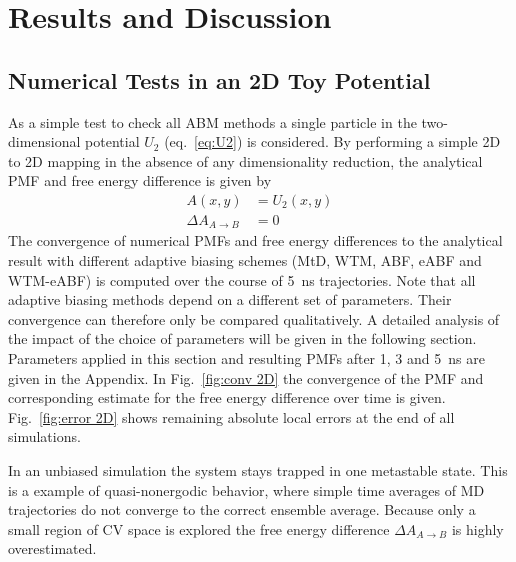 \chapter{Results and Discussion}
\label{cha:results}
\section{Numerical Tests in an 2D Toy Potential}
\label{sec:2D}
As a simple test to check all ABM methods a single particle in the two-dimensional potential $U_2$ (eq.~\ref{eq:U2}) is considered.
By performing a simple 2D to 2D mapping in the absence of any dimensionality reduction, the analytical PMF and free energy difference is given by
\begin{equation}
  \begin{split}
    A(x,y)&=U_2(x,y) \\
    \Delta A_{A\to B} &= 0
  \end{split}
\end{equation}
The convergence of numerical PMFs and free energy differences to the analytical result with different adaptive biasing schemes (MtD, WTM, ABF, eABF and WTM-eABF) is computed over the course of 5~ns trajectories.
Note that all adaptive biasing methods depend on a different set of parameters.
Their convergence can therefore only be compared qualitatively.
A detailed analysis of the impact of the choice of parameters will be given in the following section.
Parameters applied in this section and resulting PMFs after 1, 3 and 5~ns are given in the Appendix.
In Fig.~\ref{fig:conv 2D} the convergence of the PMF and corresponding estimate for the free energy difference over time is given.
Fig.~\ref{fig:error 2D} shows remaining absolute local errors at the end of all simulations.

In an unbiased simulation the system stays trapped in one metastable state.
This is a example of quasi-nonergodic behavior, where simple time averages of MD trajectories do not converge to the correct ensemble average.
Because only a small region of CV space is explored the free energy difference $\Delta A_{A\to B}$ is highly overestimated.

